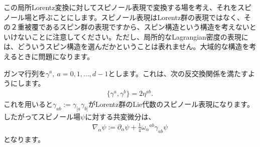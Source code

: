 \documentclass[report,paper=a4, fontsize=12pt, line_length=16cm, number_of_lines=34,dvipdfmx]{jlreq}
\numberwithin{equation}{chapter}
\numberwithin{equation}{section}
\newcommand{\del}{\partial}
\begin{document}
この局所Lorentz変換に対してスピノール表現で変換する場を考え、それをスピノール場と呼ぶことにします。スピノール表現はLorentz群の表現ではなく、その２重被覆であるスピン群の表現ですから、スピン構造という構造を考えないといけないことに注意してください。ただし、局所的なLagrangian密度の表現には、どういうスピン構造を選んだかということは表れません。大域的な構造を考えるときに問題になります。

ガンマ行列を$\gamma^{a},\ a=0,1,\dots,d-1$とします。これは、次の反交換関係を満たすようにします。
\begin{align}
  \{\gamma^{a},\gamma^{b}\}=2\eta^{ab}.
\end{align}
これを用いると$\gamma_{ab}:=\gamma_{[a}\gamma_{b]}$がLorentz群のLie代数のスピノール表現になります。したがってスピノール場$\psi$に対する共変微分は、
\begin{align}
  \nabla_{\alpha}\psi:=\del_{\alpha}\psi+\frac14\omega_{\alpha}{}^{ab}\gamma_{ab}\psi
\end{align}
となります。
\end{document}
